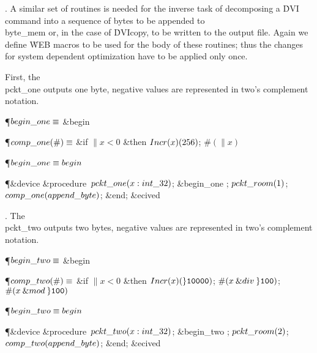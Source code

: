 . A similar set of routines is needed for the inverse task of
decomposing a \.{DVI} command into a sequence of bytes to be appended
to \\{byte\_mem} or, in the case of \.{DVIcopy}, to be written to the
output file. Again we define \.{WEB} macros to be used for the body
of these routines; thus the changes for system dependent optimization
have to be applied only once.

First, the \\{pckt\_one} outputs one byte, negative values are represented
in two's complement notation.

\Y\P\D $\\{begin\_one}\S$ \6
\&{begin} \par
\P\D {}$\\{comp\_one}(\#)\S$\1\6
\&{if} $\|x<0$ \1\&{then}\5
$\\{Incr}(\|x)(256)$;\2\2\6
$\#(\|x)$\par
\P\F {}$\\{begin\_one}\S\\{begin}$\par
\Y\P\&{device} \&{procedure}\1\  $\\{pckt\_one}(\|x:\\{int\_32})$;%
\2\6
\&{begin\_one} ;\5
$\\{pckt\_room}(1)$;\5
$\\{comp\_one}(\\{append\_byte})$;\6
\&{end};\6
\&{ecived}\par
\fi

. The \\{pckt\_two} outputs two bytes, negative values are represented in
two's complement notation.

\Y\P\D $\\{begin\_two}\S$ \6
\&{begin} \par
\P\D {}$\\{comp\_two}(\#)\S$\1\6
\&{if} $\|x<0$ \1\&{then}\5
$\\{Incr}(\|x)(\H{10000})$;\2\2\6
$\#(\|x\mathbin{\&{div}}\H{100})$;\5
$\#(\|x\mathbin{\&{mod}}\H{100})$\par
\P\F {}$\\{begin\_two}\S\\{begin}$\par
\Y\P\&{device} \&{procedure}\1\  $\\{pckt\_two}(\|x:\\{int\_32})$;%
\2\6
\&{begin\_two} ;\5
$\\{pckt\_room}(2)$;\5
$\\{comp\_two}(\\{append\_byte})$;\6
\&{end};\6
\&{ecived}\par
\fi

